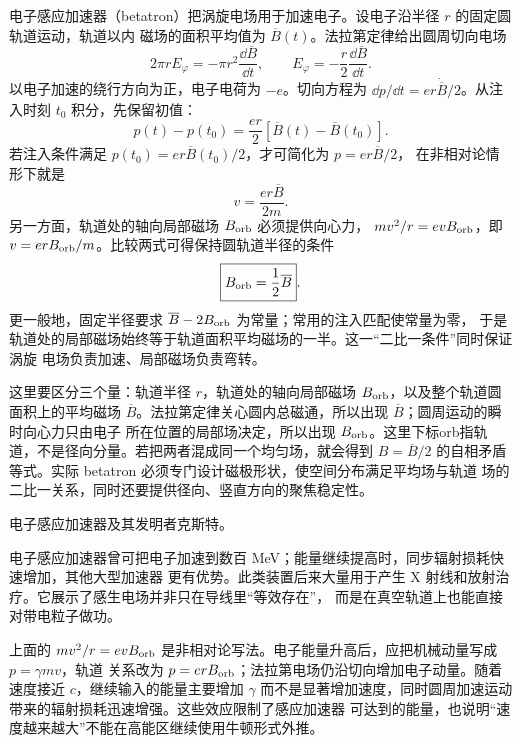 {电子感应加速器（betatron）把涡旋电场用于加速电子。设电子沿半径 $r$ 的固定圆轨道运动，轨道以内
磁场的面积平均值为 $\overline B(t)$。法拉第定律给出圆周切向电场
\begin{equation}
  2\pi rE_\varphi=-\pi r^2\frac{\dd\overline B}{\dd t},
  \qquad
  E_\varphi=-\frac r2\frac{\dd\overline B}{\dd t}.
\end{equation}
以电子加速的绕行方向为正，电子电荷为 $-e$。切向方程为
$\dd p/\dd t=er\dot{\overline B}/2$。从注入时刻 $t_0$ 积分，先保留初值：
\begin{equation}
 p(t)-p(t_0)=\frac{er}{2}[\overline B(t)-\overline B(t_0)].
\end{equation}
若注入条件满足 $p(t_0)=er\overline B(t_0)/2$，才可简化为 $p=er\overline B/2$，
在非相对论情形下就是
\begin{equation}
  v=\frac{er\overline B}{2m}.
\end{equation}
另一方面，轨道处的轴向局部磁场 $B_{\rm orb}$ 必须提供向心力，
$mv^2/r=evB_{\rm orb}$，即 $v=erB_{\rm orb}/m$。比较两式可得保持圆轨道半径的条件
\begin{equation}
  \boxed{B_{\rm orb}=\frac12\overline B}.
\end{equation}
更一般地，固定半径要求 $\overline B-2B_{\rm orb}$ 为常量；常用的注入匹配使常量为零，
于是轨道处的局部磁场始终等于轨道面积平均磁场的一半。这一“二比一条件”同时保证涡旋
电场负责加速、局部磁场负责弯转。

这里要区分三个量：轨道半径 $r$，轨道处的轴向局部磁场 $B_{\rm orb}$，以及整个轨道圆面积上的平均磁场
$\overline B$。法拉第定律关心圆内总磁通，所以出现 $\overline B$；圆周运动的瞬时向心力只由电子
所在位置的局部场决定，所以出现 $B_{\rm orb}$。这里下标orb指轨道，不是径向分量。若把两者混成同一个均匀场，就会得到
$B=\overline B/2$ 的自相矛盾等式。实际 betatron 必须专门设计磁极形状，使空间分布满足平均场与轨道
场的二比一关系，同时还要提供径向、竖直方向的聚焦稳定性。

{电子感应加速器及其发明者克斯特。}\label{ch24:fig:s40-9-6}

电子感应加速器曾可把电子加速到数百 MeV；能量继续提高时，同步辐射损耗快速增加，其他大型加速器
更有优势。此类装置后来大量用于产生 X 射线和放射治疗。它展示了感生电场并非只在导线里“等效存在”，
而是在真空轨道上也能直接对带电粒子做功。

上面的 $mv^2/r=evB_{\rm orb}$ 是非相对论写法。电子能量升高后，应把机械动量写成 $p=\gamma mv$，轨道
关系改为 $p=erB_{\rm orb}$；法拉第电场仍沿切向增加电子动量。随着速度接近 $c$，继续输入的能量主要增加
$\gamma$ 而不是显著增加速度，同时圆周加速运动带来的辐射损耗迅速增强。这些效应限制了感应加速器
可达到的能量，也说明“速度越来越大”不能在高能区继续使用牛顿形式外推。


}
